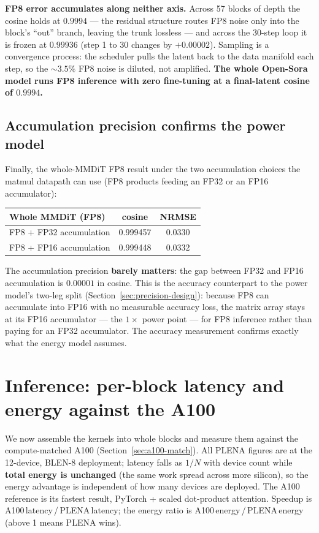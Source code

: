 \documentclass[11pt]{report}
\begin{document}
\textbf{FP8 error accumulates along neither axis.} Across 57 blocks of depth
the cosine holds at $0.9994$ --- the residual structure routes FP8 noise only
into the block's ``out'' branch, leaving the trunk lossless --- and across
the 30-step loop it is frozen at $0.99936$ (step 1 to 30 changes by
$+0.00002$). Sampling is a convergence process: the scheduler pulls the
latent back to the data manifold each step, so the ${\sim}3.5\%$ FP8 noise is
diluted, not amplified. \textbf{The whole Open-Sora model runs FP8 inference
with zero fine-tuning at a final-latent cosine of $0.9994$.}

\subsection{Accumulation precision confirms the power model}

Finally, the whole-MMDiT FP8 result under the two accumulation choices the
matmul datapath can use (FP8 products feeding an FP32 or an FP16
accumulator):

\begin{center}
\begin{tabular}{@{}lcc@{}}
\toprule
Whole MMDiT (FP8) & cosine & NRMSE \\
\midrule
FP8 + FP32 accumulation & 0.999457 & 0.0330 \\
FP8 + FP16 accumulation & 0.999448 & 0.0332 \\
\bottomrule
\end{tabular}
\end{center}

\noindent The accumulation precision \textbf{barely matters}: the gap between
FP32 and FP16 accumulation is $0.00001$ in cosine. This is the accuracy
counterpart to the power model's two-leg split
(Section~\ref{sec:precision-design}): because FP8 can accumulate into FP16
with no measurable accuracy loss, the matrix array stays at its FP16
accumulator --- the $1\times$ power point --- for FP8 inference rather than
paying for an FP32 accumulator. The accuracy measurement confirms exactly
what the energy model assumes.

\section{Inference: per-block latency and energy against the A100}
\label{sec:results-latency}

We now assemble the kernels into whole blocks and measure them against the
compute-matched A100 (Section~\ref{sec:a100-match}). All PLENA figures are
at the 12-device, BLEN-8 deployment; latency falls as $1/N$ with device
count while \textbf{total energy is unchanged} (the same work spread across
more silicon), so the energy advantage is independent of how many devices
are deployed. The A100 reference is its fastest result, PyTorch + scaled
dot-product attention. Speedup is A100\,latency\,/\,PLENA\,latency; the
energy ratio is A100\,energy\,/\,PLENA\,energy (above 1 means PLENA wins).
\end{document}
